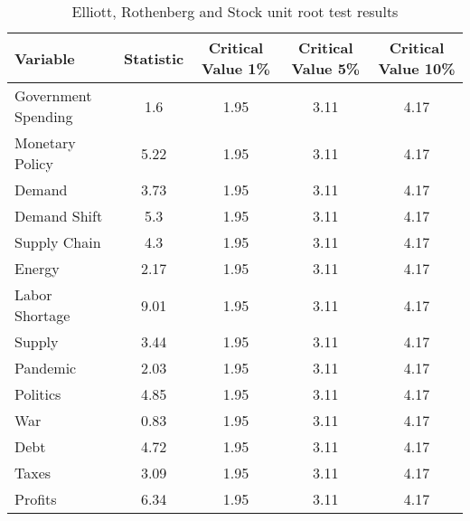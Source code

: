 \begin{sidewaystable}[H]
\centering
\caption{Elliott, Rothenberg and Stock unit root test results}\label{table:ers}

\begin{tabular}{lcccc}
\toprule
\textbf{Variable} & \textbf{Statistic} & \textbf{Critical Value 1\%} & \textbf{Critical Value 5\%} & \textbf{Critical Value 10\%} \\
\midrule
Government Spending & 1.6 & 1.95 & 3.11 & 4.17 \\
Monetary Policy & 5.22 & 1.95 & 3.11 & 4.17 \\
Demand & 3.73 & 1.95 & 3.11 & 4.17 \\
Demand Shift & 5.3 & 1.95 & 3.11 & 4.17 \\
Supply Chain & 4.3 & 1.95 & 3.11 & 4.17 \\
Energy & 2.17 & 1.95 & 3.11 & 4.17 \\
Labor Shortage & 9.01 & 1.95 & 3.11 & 4.17 \\
Supply & 3.44 & 1.95 & 3.11 & 4.17 \\
Pandemic & 2.03 & 1.95 & 3.11 & 4.17 \\
Politics & 4.85 & 1.95 & 3.11 & 4.17 \\
War & 0.83 & 1.95 & 3.11 & 4.17 \\
Debt & 4.72 & 1.95 & 3.11 & 4.17 \\
Taxes & 3.09 & 1.95 & 3.11 & 4.17 \\
Profits & 6.34 & 1.95 & 3.11 & 4.17 \\
\bottomrule
\end{tabular}
\end{sidewaystable}
